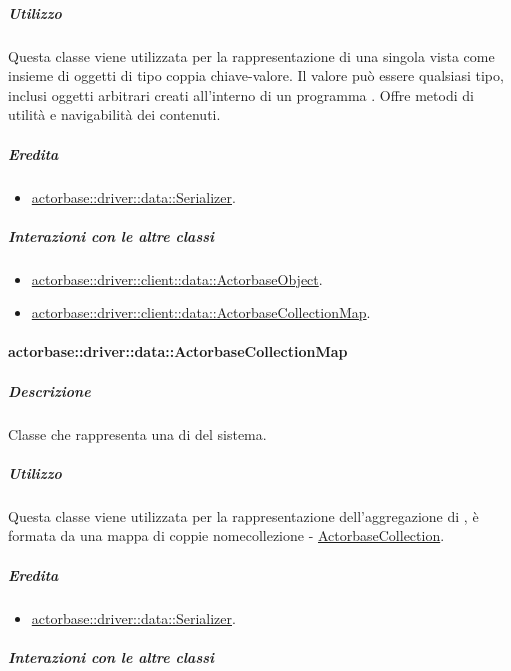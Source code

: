 \documentclass{scalatekids-article}
\begin{document}
\subparagraph{Utilizzo}

Questa classe viene utilizzata per la rappresentazione di una singola
 vista come insieme di oggetti di tipo coppia chiave-valore.
Il valore può essere qualsiasi tipo, inclusi oggetti arbitrari creati
all'interno di un programma . Offre metodi di utilità e
navigabilità dei contenuti.

\subparagraph{Eredita}

\begin{itemize}
\item \hyperref[sec:actorbase::driver::data::Serializer]{actorbase::driver::data::Serializer}.
\end{itemize}

\subparagraph{Interazioni con le altre classi}

\begin{itemize}
\item \hyperref[sec:actorbase::driver::client::data::ActorbaseObject]{actorbase::driver::client::data::ActorbaseObject}.
\item \hyperref[sec:actorbase::driver::client::data::ActorbaseCollectionMap]{actorbase::driver::client::data::ActorbaseCollectionMap}.
\end{itemize}

\paragraph{actorbase::driver::data::ActorbaseCollectionMap}
\label{sec:actorbase::driver::data::ActorbaseCollectionMap}

\subparagraph{Descrizione}

Classe che rappresenta una  di  del sistema.

\subparagraph{Utilizzo}

Questa classe viene utilizzata per la rappresentazione dell'aggregazione di
, è formata da una mappa di coppie nomecollezione -
\hyperref[sec:actorbase::driver::data::ActorbaseCollection]{ActorbaseCollection}.

\subparagraph{Eredita}

\begin{itemize}
\item \hyperref[sec:actorbase::driver::data::Serializer]{actorbase::driver::data::Serializer}.
\end{itemize}

\subparagraph{Interazioni con le altre classi}
\end{document}
